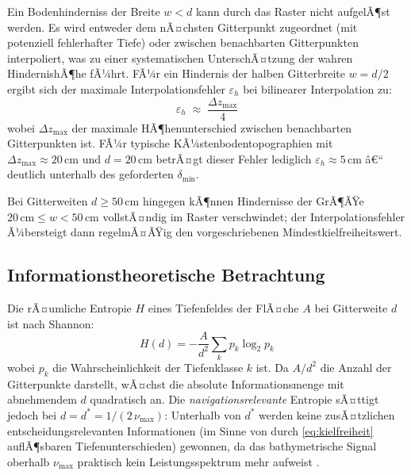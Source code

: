 ﻿\documentclass[a4paper,12pt]{article}
\theoremstyle{definition}
\begin{document}
\medskip\noindent
Ein Bodenhinderniss der Breite $w < d$ kann durch das Raster nicht
aufgelÃ¶st werden. Es wird entweder dem nÃ¤chsten Gitterpunkt zugeordnet
(mit potenziell fehlerhafter Tiefe) oder zwischen benachbarten
Gitterpunkten interpoliert, was zu einer systematischen
UnterschÃ¤tzung der wahren HindernishÃ¶he fÃ¼hrt. FÃ¼r ein Hindernis
der halben Gitterbreite $w = d/2$ ergibt sich der maximale
Interpolationsfehler $\varepsilon_h$ bei bilinearer Interpolation zu:
\begin{equation}
  \varepsilon_h \;\approx\; \frac{\Delta z_{\max}}{4}
  \label{eq:interpfehler}
\end{equation}
wobei $\Delta z_{\max}$ der maximale HÃ¶henunterschied zwischen
benachbarten Gitterpunkten ist. FÃ¼r typische KÃ¼stenbodentopographien
mit $\Delta z_{\max} \approx 20\,\text{cm}$ und $d = 20\,\text{cm}$
betrÃ¤gt dieser Fehler lediglich $\varepsilon_h \approx 5\,\text{cm}$
â€“ deutlich unterhalb des geforderten $\delta_{\min}$.

\medskip\noindent
Bei Gitterweiten $d \geq 50\,\text{cm}$ hingegen kÃ¶nnen Hindernisse der
GrÃ¶ÃŸe $20\,\text{cm} \leq w < 50\,\text{cm}$ vollstÃ¤ndig im Raster
verschwindet; der Interpolationsfehler Ã¼bersteigt dann regelmÃ¤ÃŸig den
vorgeschriebenen Mindestkielfreiheitswert.

\subsection{Informationstheoretische Betrachtung}

Die rÃ¤umliche Entropie $H$ eines Tiefenfeldes der FlÃ¤che $A$ bei
Gitterweite $d$ ist nach Shannon:
\begin{equation}
  H(d) = -\frac{A}{d^2}\sum_{k} p_k \log_2 p_k
  \label{eq:entropie}
\end{equation}
wobei $p_k$ die Wahrscheinlichkeit der Tiefenklasse $k$ ist. Da
$A/d^2$ die Anzahl der Gitterpunkte darstellt, wÃ¤chst die
absolute Informationsmenge mit abnehmendem $d$ quadratisch an.
Die \emph{navigationsrelevante} Entropie sÃ¤ttigt jedoch bei
$d = d^* = 1/(2\,\nu_{\max})$: Unterhalb von $d^*$ werden keine
zusÃ¤tzlichen entscheidungsrelevanten Informationen (im Sinne von
durch \eqref{eq:kielfreiheit} auflÃ¶sbaren Tiefenunterschieden)
gewonnen, da das bathymetrische Signal oberhalb $\nu_{\max}$
praktisch kein Leistungsspektrum mehr aufweist \cite{goff1988}.
\end{document}
